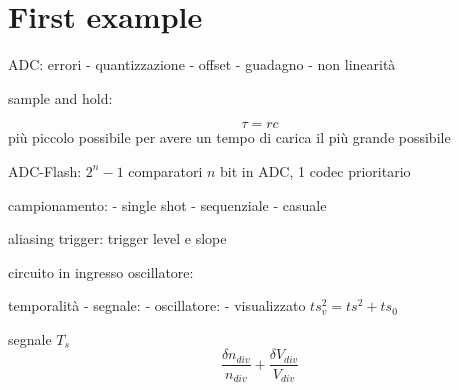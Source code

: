 \documentclass{article}
\begin{document}
\section{First example}
ADC: errori
- quantizzazione
- offset
- guadagno
- non linearità




sample and hold:

$$\tau = rc$$ più piccolo possibile per avere un tempo di carica il più grande possibile

ADC-Flash: $2^n -1$ comparatori $n$ bit in ADC, 1 codec prioritario


campionamento:
- single shot
- sequenziale
- casuale


aliasing
trigger: trigger level e slope

circuito in ingresso oscillatore:



temporalità
- segnale:
- oscillatore:
- visualizzato $ts_v^2 = ts^2+ts_0$

segnale $T_s$
$$\frac{\delta n_{div}}{n_{div}} + \frac{\delta V_{div}}{V_{div}}$$
\end{document}

